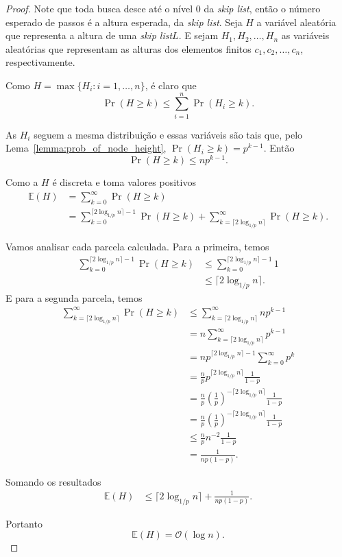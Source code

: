 \documentclass[paper=a4, fontsize=11pt]{scrartcl} %
\numberwithin{equation}{section}
\numberwithin{figure}{section}
\numberwithin{table}{section}
\numberwithin{definition}{section}
\numberwithin{theorem}{section}
\numberwithin{property}{section}
\numberwithin{proposition}{section}
\newcommand{\cO}{\ensuremath{\mathcal{O}}}
\newcommand{\skl}{\textit{skip list}\xspace}
\newcommand{\Exp}{\ensuremath{{\mathbb{E}}}\xspace}
\begin{document}
\begin{proof}

Note que toda busca desce até o nível 0 da \skl, então o número esperado de passos é a altura esperada, da \skl. Seja $H$ a variável aleatória que representa a altura de uma \skl $L$. E sejam 
$H_1, H_2, \ldots, H_n$ as variáveis aleatórias que representam as alturas dos elementos finitos
$c_1, c_2, \ldots, c_n$, respectivamente.

Como $H = \max \{H_i : i = 1, \ldots, n \}$, é claro que
$$
\Pr(H \geq k) \leq \sum_{i=1}^n \Pr(H_i \geq k).
$$

As $H_i$ seguem a mesma distribuição e essas variáveis são tais que, pelo Lema~\ref{lemma:prob_of_node_height},  
 $ \Pr(H_i \geq k) = p^{k - 1}$. Então
$$
\Pr(H \geq k) \leq np^{k - 1}.
$$

Como a $H$ é discreta e toma valores positivos
\begin{align*}
\Exp(H) &= \sum_{k = 0}^{\infty} \Pr(H \geq k)  \\
        &= \sum_{k = 0}^{\lceil 2 \log_{1/p} n \rceil - 1} \Pr(H \geq k) +
        \sum_{k = \lceil 2 \log_{1/p} n \rceil}^{\infty} \Pr(H \geq k).
\end{align*}

Vamos analisar cada parcela calculada. Para a primeira, temos
\begin{align*}
\sum_{k = 0}^{\lceil 2 \log_{1/p} n \rceil - 1} \Pr(H \geq k) &\leq 
  \sum_{k = 0}^{\lceil 2 \log_{1/p} n \rceil - 1} 1 \\
&\leq \lceil 2 \log_{1/p} n \rceil.
\end{align*}
E para a segunda parcela, temos
\begin{align*}
\sum_{k = \lceil 2 \log_{1/p} n \rceil}^{\infty} \Pr(H \geq k) 
   &\leq \sum_{k = \lceil 2 \log_{1/p} n \rceil}^{\infty} np^{k - 1} \\
   &= n \sum_{k = \lceil 2 \log_{1/p} n \rceil}^{\infty} p^{k - 1} \\
   &= n p^{\lceil 2 \log_{1/p} n \rceil - 1} \sum_{k = 0}^{\infty} p^k \\
   &= \frac{n}{p} p^{\lceil 2 \log_{1/p} n \rceil} \frac{1}{1 - p} \\
   &= \frac{n}{p} \left( \frac{1}{p} \right)^{- \lceil 2 \log_{1/p} n \rceil} \frac{1}{1 - p} \\
   &= \frac{n}{p} \left( \frac{1}{p} \right)^{- \lceil 2 \log_{1/p} n \rceil} \frac{1}{1 - p} \\
   &\leq \frac{n}{p} n^{-2} \frac{1}{1 - p} \\
   &= \frac{1}{np(1 - p)}.
\end{align*}

Somando os resultados
\begin{align*}
\Exp(H) &\leq \lceil 2 \log_{1/p} n \rceil + \frac{1}{np(1 - p)}.
\end{align*}

Portanto
$$
\Exp(H) = \cO(\log n).
$$
\end{proof}
\end{document}
